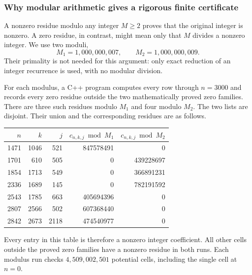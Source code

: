 \documentclass[11pt,a4paper]{article}
\numberwithin{equation}{section}
\theoremstyle{definition}
\theoremstyle{remark}
\theoremstyle{plain}
\begin{document}
\subsubsection{Why modular arithmetic gives a rigorous finite certificate}
A nonzero residue modulo any integer $M\ge2$ proves that the original
integer is nonzero. A zero residue, in contrast, might mean only that
$M$ divides a nonzero integer. We use two moduli,
\begin{equation}\label{xxb:eq:moduli}
 M_1=1{,}000{,}000{,}007,\qquad M_2=1{,}000{,}000{,}009.
\end{equation}
Their primality is not needed for this argument: only exact reduction of
an integer recurrence is used, with no modular division.

For each modulus, a C++ program computes every row through $n=3000$ and
records every zero residue outside the two mathematically proved zero
families. There are three such residues modulo $M_1$ and four modulo
$M_2$. The two lists are disjoint. Their union and the corresponding
residues are as follows.
\begin{center}
\small
\begin{tabular}{rrr|rr}
\toprule
$n$ & $k$ & $j$ & $c_{n,k,j}\bmod M_1$ & $c_{n,k,j}\bmod M_2$\\
\midrule
1471&1046&521&847578491&0\\
1701&610&505&0&439228697\\
1854&1713&549&0&366891231\\
2336&1689&145&0&782191592\\
2543&1785&663&405694396&0\\
2807&2566&502&607368440&0\\
2842&2673&2118&474540977&0\\
\bottomrule
\end{tabular}
\end{center}
Every entry in this table is therefore a nonzero integer coefficient.
All other cells outside the proved zero families have a nonzero residue
in both runs. Each modulus run checks $4{,}509{,}002{,}501$ potential
cells, including the single cell at $n=0$.
\end{document}
